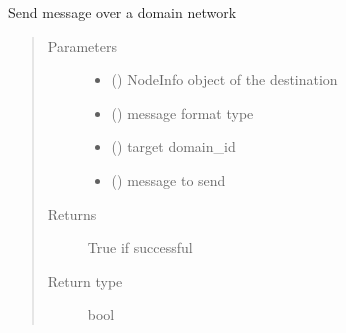 \documentclass[letterpaper,10pt,english]{sphinxmanual}
\begin{document}
\begin{fulllineitems}
\begin{fulllineitems}
\end{fulllineitems}


\begin{fulllineitems}
\label{\detokenize{bbc1.core.bbc_network:bbc1.core.bbc_network.BBcNetwork.send_message_in_network}}
Send message over a domain network
\begin{quote}\begin{description}
\item[{Parameters}] \leavevmode\begin{itemize}
\item {} 
 ({\hyperref[\detokenize{bbc1.core.bbc_network:bbc1.core.bbc_network.NodeInfo}]{}}) \textendash{} NodeInfo object of the destination

\item {} 
 () \textendash{} message format type

\item {} 
 () \textendash{} target domain\_id

\item {} 
 () \textendash{} message to send

\end{itemize}

\item[{Returns}] \leavevmode
True if successful

\item[{Return type}] \leavevmode
bool

\end{description}\end{quote}

\end{fulllineitems}



\end{fulllineitems}
\end{document}
